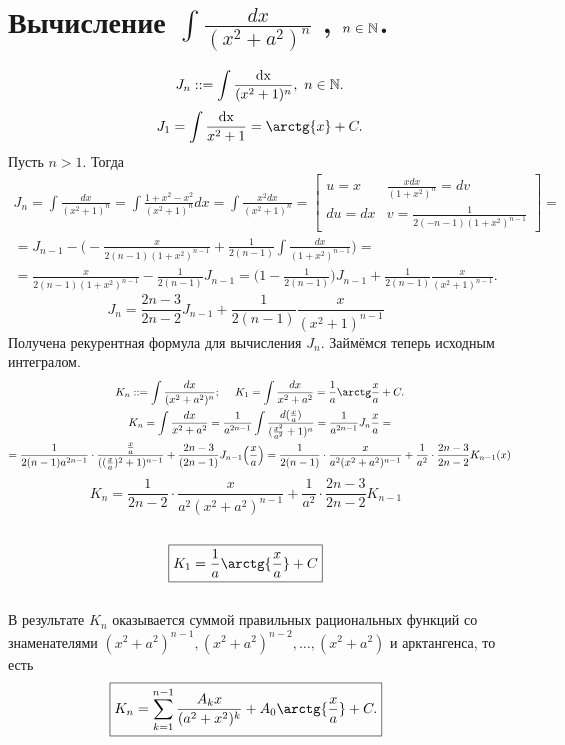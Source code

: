 \section{Вычисление $ \int \frac{dx}{(x^2 + a^2)^n} $ , $ n \in {\mathbb{N}}$.}
$$ J_n :: =  \int \frac{\dx}{(x^2 + 1)^n},\ n\in {\N}.$$
$$ J_1 = \int\limits \frac{\dx}{x^2 + 1} = \arctg{x} + C. $$
Пусть $n > 1$. Тогда 
\begin{multline*}
	J_n = \int\limits \frac{dx}{(x^2 + 1)^n} = \int\limits \frac{1 + x^2 - x^2}{(x^2 + 1)^n} dx  = \int\limits \frac{x^2dx}{(x^2 + 1)^n } = \begin{bmatrix} u = x & \frac{xdx}{(1 + x^2)^n} = dv \\ du = dx & v = \frac{1}{2(-n - 1)(1 + x^2)^{n-1}} \end{bmatrix}=\\ = J_{n - 1} - \Big( - \frac{x}{2(n - 1)(1 + x^2)^{n - 1}} + \frac{1}{2(n - 1)} \int\limits \frac{dx}{(1 + x^2)^{n - 1}}\Big) =\\ = \frac{x}{2(n - 1)(1 + x^2)^{n - 1}} - \frac{1}{2(n - 1)} J_{n-1} = \Big(1 - \frac{1}{2(n - 1)}\Big)J_{n - 1} + \frac{1}{2(n - 1)} \frac{x}{(x^2 + 1)^{n - 1}}.
\end{multline*}
\[
\boxed{ J_n = \frac{2n - 3}{2n -2}J_{n - 1} + \frac{1}{2(n - 1)} \frac{x}{(x^2 + 1)^{n - 1} }} \qquad
\]
Получена рекурентная формула для вычисления $ J_n $. Займёмся теперь исходным интегралом.
\begin{multline*}
	K_n :: =  \int\limits \frac{dx}{(x^2 + a^2)^n} ;\quad  \ K_1 =  \int\limits \frac{dx}{x^2 + a^2} = \frac{1}{a} \arctg \frac{x}{a} + C. \\
	K_n = \int\limits \frac{dx}{x^2 + a^2} = \frac{1}{a^{2n - 1}} \int\limits \frac{d( \frac{x}{a})}{( \frac{x^2}{a^2} + 1)^n} = \frac{1}{a^{2n-1}} J_{n} \frac{x}{a}=\\ = \frac{1}{2(n - 1)a^{2n - 1}}\cdot \frac{\frac{x}{a}}{((\frac{x}{a})^2 + 1)^{n - 1}} + \frac{2n - 3}{(2n - 1)} J_{n-1} \Big(\frac{x}{a}\Big) = \frac{1}{2(n - 1)} \cdot\frac{x}{a^2(x^2 + a^2)^{n - 1}} + \frac{1}{a^2}\cdot \frac{2n - 3}{2n - 2} K_{n - 1}(x)
\end{multline*}
\[
\boxed{  K_n = \frac{1}{2n - 2} \cdot \frac{x}{a^2(x^2 + a^2)^{n - 1}} + \frac{1}{a^2}\cdot \frac{2n - 3}{2n - 2} K_{n - 1}  } \qquad
\]\\
\[
\boxed{ K_1 = \frac{1}{a} \arctg{\frac{x}{a}} + C } \qquad
\]\\
В результате $ K_n $ оказывается суммой правильных рациональных функций со знаменателями $ (x^2 + a^2)^{n - 1}, (x^2 + a^2)^{n - 2}, \dots, (x^2 + a^2) $ и арктангенса, то есть
\[
\boxed{ K_n = \sum\limits_{k = 1}^{n - 1}  \frac{A_k x}{(a^2 + x^2)^k} + A_0 \arctg{\frac{x}{a}} + C. } \qquad
\]
